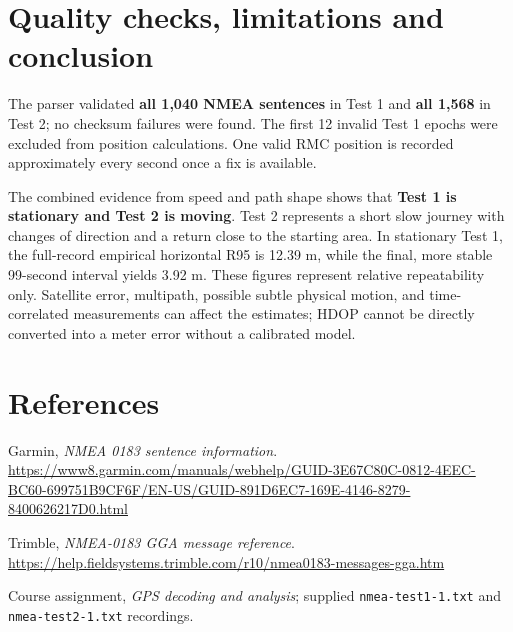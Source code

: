 \documentclass[11pt,a4paper]{article}
\begin{document}
\section{Quality checks, limitations and conclusion}

The parser validated \textbf{all 1,040 NMEA sentences} in Test 1 and \textbf{all 1,568} in Test 2; no checksum failures were found. The first 12 invalid Test 1 epochs were excluded from position calculations. One valid RMC position is recorded approximately every second once a fix is available.

The combined evidence from speed and path shape shows that \textbf{Test 1 is stationary and Test 2 is moving}. Test 2 represents a short slow journey with changes of direction and a return close to the starting area. In stationary Test 1, the full-record empirical horizontal R95 is 12.39 m, while the final, more stable 99-second interval yields 3.92 m. These figures represent relative repeatability only. Satellite error, multipath, possible subtle physical motion, and time-correlated measurements can affect the estimates; HDOP cannot be directly converted into a meter error without a calibrated model.

\section*{References}
\begingroup
\small
\begin{enumerate}[leftmargin=*,label={[\arabic*]},itemsep=2pt]
 \item Garmin, \emph{NMEA 0183 sentence information}. \url{https://www8.garmin.com/manuals/webhelp/GUID-3E67C80C-0812-4EEC-BC60-699751B9CF6F/EN-US/GUID-891D6EC7-169E-4146-8279-8400626217D0.html}
 \item Trimble, \emph{NMEA-0183 GGA message reference}. \url{https://help.fieldsystems.trimble.com/r10/nmea0183-messages-gga.htm}
 \item Course assignment, \emph{GPS decoding and analysis}; supplied \texttt{nmea-test1-1.txt} and \texttt{nmea-test2-1.txt} recordings.
\end{enumerate}
\endgroup
\end{document}
